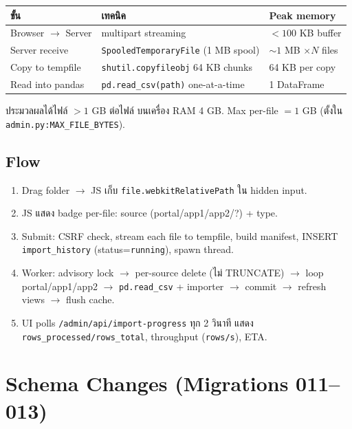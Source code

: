 \documentclass[11pt,a4paper]{article}
\begin{document}
\begin{center}
\footnotesize
\begin{tabular}{lll}
\toprule
\textbf{ขั้น} & \textbf{เทคนิค} & \textbf{Peak memory} \\
\midrule
Browser $\rightarrow$ Server & multipart streaming            & $< 100$ KB buffer \\
Server receive              & \texttt{SpooledTemporaryFile} (1 MB spool) & $\sim 1$ MB $\times N$ files \\
Copy to tempfile            & \texttt{shutil.copyfileobj} 64 KB chunks    & 64 KB per copy \\
Read into pandas            & \texttt{pd.read\_csv(path)} one-at-a-time   & 1 DataFrame \\
\bottomrule
\end{tabular}
\end{center}

ประมวลผลได้ไฟล์ $> 1$ GB ต่อไฟล์ บนเครื่อง RAM 4 GB.
Max per-file $= 1$ GB (ตั้งใน \texttt{admin.py:MAX\_FILE\_BYTES}).

\subsection{Flow}

\begin{enumerate}[leftmargin=*, itemsep=1pt]
  \item Drag folder $\rightarrow$ JS เก็บ \texttt{file.webkitRelativePath} ใน hidden input.
  \item JS แสดง badge per-file: source (portal/app1/app2/?) + type.
  \item Submit: CSRF check, stream each file to tempfile, build manifest,
    INSERT \texttt{import\_history} (status=\texttt{running}), spawn thread.
  \item Worker: advisory lock $\rightarrow$ per-source delete (ไม่ TRUNCATE)
    $\rightarrow$ loop portal/app1/app2 $\rightarrow$ \texttt{pd.read\_csv} + importer
    $\rightarrow$ commit $\rightarrow$ refresh views $\rightarrow$ flush cache.
  \item UI polls \texttt{/admin/api/import-progress} ทุก 2 วินาที แสดง \texttt{rows\_processed/rows\_total},
    throughput (\texttt{rows/s}), ETA.
\end{enumerate}

\section{Schema Changes (Migrations 011--013)}
\end{document}
